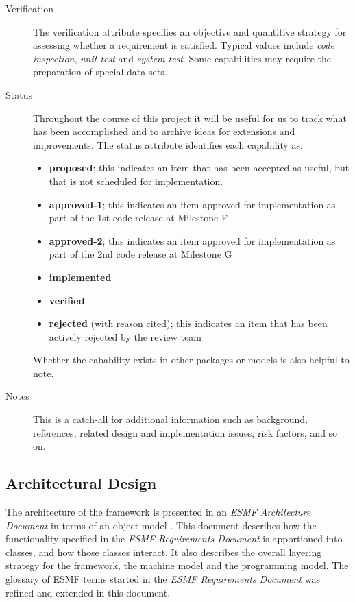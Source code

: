 \begin{description}
\item [Verification] The verification attribute specifies an objective
and quantitive strategy for assessing whether a requirement is
satisfied.  Typical values include {\it code inspection}, 
{\it unit test} and {\it system test}.
Some capabilities may require the preparation of special data sets.

\item [Status] Throughout the course of this project it will be 
useful for us to track what has been accomplished and to archive 
ideas for extensions and improvements.  The status attribute identifies
each capability as:
\begin{itemize}
\item {\bf proposed}; this indicates an item that has been accepted as useful, but
that is not scheduled for implementation.
\item {\bf approved-1}; this indicates an item approved for implementation as part
of the 1st code release at Milestone F
\item {\bf approved-2}; this indicates an item approved for implementation as part 
of the 2nd code release at Milestone G
\item {\bf implemented}
\item {\bf verified}
\item {\bf rejected} (with reason cited); this indicates an item that has been actively rejected by
the review team 
\end{itemize}
Whether the cabability exists in other packages or models
is also helpful to note.

\item [Notes] This is a catch-all for additional information such
as background, references, related design and implementation issues, 
risk factors, and so on.

\end{description}

\subsection{Architectural Design}

The architecture of the framework is presented in an {\it ESMF 
Architecture Document} in terms of an object model \cite{bib:ESMFarchdoc}.  This document describes 
how the functionality specified in the {\it ESMF Requirements Document} is 
apportioned into classes, and how those classes interact.  It also
describes the overall layering strategy for the framework, the machine 
model and the programming model.  The glossary of ESMF terms started in the 
{\it ESMF Requirements Document} was refined and extended in this 
document.


